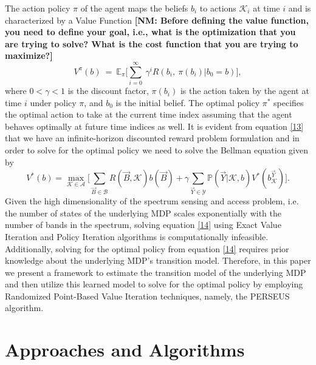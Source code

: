 \documentclass[10pt,twocolumn]{IEEEtran}
\newcommand{\nm}[1]{{\color{blue}\bf{[NM: #1]}}}
\begin{document}
 The action policy $\pi$ of the agent maps the beliefs $b_i$ to actions $\mathcal{K}_i$ at time $i$ and is characterized by a Value Function
 \nm{Before defining the value function, you need to define your goal, i.e., what is the optimization that you are trying to solve? What is the cost function that you are trying to maximize?}
\begin{equation}\label{13}
    V^{\pi}(b)\ =\ \mathbb{E}_{\pi}\Big[\sum_{i=0}^{\infty}\ \gamma^i R(b_i,\ \pi(b_i)|b_0=b)\Big],
\end{equation}
where $0 < \gamma < 1$ is the discount factor, $\pi(b_i)$ is the action taken by the agent at time $i$ under policy $\pi$, and $b_0$ is the initial belief. The optimal policy $\pi^*$ specifies the optimal action to take at the current time index assuming that the agent behaves optimally at future time indices as well. It is evident from equation \eqref{13} that we have an infinite-horizon discounted reward problem formulation and in order to solve for the optimal policy we need to solve the Bellman equation given by
\begin{equation}\label{14}
    V^*(b)=\max_{\mathcal{K}\in\mathcal{A}}\Big[\sum_{\vec{B}\in\mathcal{B}}R(\vec{B},\mathcal{K})b(\vec{B})+\gamma \sum_{\vec{Y}\in\mathcal{Y}}\mathbb{P}(\vec{Y}|\mathcal{K},b)V^*(b_{\mathcal{K}}^{\vec{Y}})\Big].
\end{equation}
Given the high dimensionality of the spectrum sensing and access problem, i.e. the number of states of the underlying MDP scales exponentially with the number of bands in the spectrum, solving equation \eqref{14} using Exact Value Iteration and Policy Iteration algorithms is computationally infeasible. Additionally, solving for the optimal policy from equation \eqref{14} requires prior knowledge about the underlying MDP's transition model. Therefore, in this paper we present a framework to estimate the transition model of the underlying MDP and then utilize this learned model to solve for the optimal policy by employing Randomized Point-Based Value Iteration techniques, namely, the PERSEUS algorithm.
\section{Approaches and Algorithms}
\end{document}
